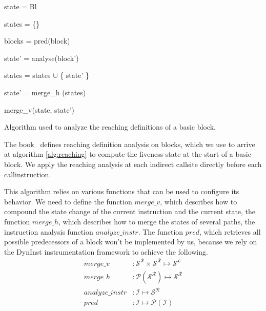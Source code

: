   \begin{algorithm}[!h]
	\SetAlgoLined
	{
 	state = Bl
 	

	states = \{\}
	
	blocks = pred(block)
	
	 {
	
 		state' = analyse(block')
 		
		states = states $\cup$ \{ state' \}
	}

	state' = merge\_h (states)

	\Return merge\_v(state, state')

	}
\caption{Algorithm used to analyze the reaching definitions of a basic block.}
\label{alg:reaching}
\end{algorithm}
%
%
The book~\cite{khedker2009data} defines reaching definition analysis on blocks, which we use to arrive at algorithm \ref{alg:reaching} to compute the liveness state at the start of a basic block. We apply the reaching analysis at each indirect callsite directly before each callinstruction.

This algorithm relies on various functions that can be used to configure its behavior. We need to define the 
function $merge\_v$, which describes how to compound the state change of the current instruction and the current state, 
the function $merge\_h$, which describes how to merge the states of several paths, the instruction analysis function
$analyze\_instr$. The function $pred$, which retrieves all possible predecessors of a block won't be implemented by us, 
because we rely on the DynInst instrumentation framework to achieve the following.
\begin{subequations}
\label{eq:livenesscustom}
\begin{align}
merge\_v &: \mathcal{S}^\mathcal{R} \times \mathcal{S}^\mathcal{R} \mapsto \mathcal{S}^\mathcal{L}\\
merge\_h &: \mathcal{P}(\mathcal{S}^\mathcal{R}) \mapsto \mathcal{S}^\mathcal{R}\\
analyze\_instr &: \mathcal {I} \mapsto \mathcal{S}^\mathcal{R} \\
pred &: \mathcal{I} \mapsto \mathcal{P}(\mathcal{I})
\end{align}
\end{subequations}

